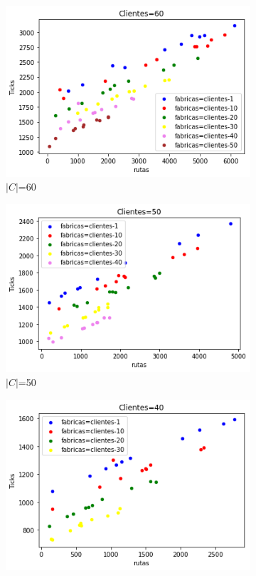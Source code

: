 \documentclass[A4paper,oneside,fleqn,11pt]{article}
\theoremstyle{definition}
\begin{document}
\begin{figure}[H] %
    \begin{subfigure}[b]{0.3\textwidth}
        \includegraphics[width=\textwidth]{60clientes.png}
        \caption[center]{$|C|$=60}
        \label{ni se pa que sirve esto}
    \end{subfigure}
    \begin{subfigure}[b]{0.3\textwidth}
        \includegraphics[width=\textwidth]{50clientes.png}
        \caption{$|C|$=50}
        \label{ni se pa que sirve esto}
    \end{subfigure}
	\begin{subfigure}[b]{0.3\textwidth}
        \includegraphics[width=\textwidth]{40clientes.png}

\end{subfigure}
\end{figure}
\end{document}
